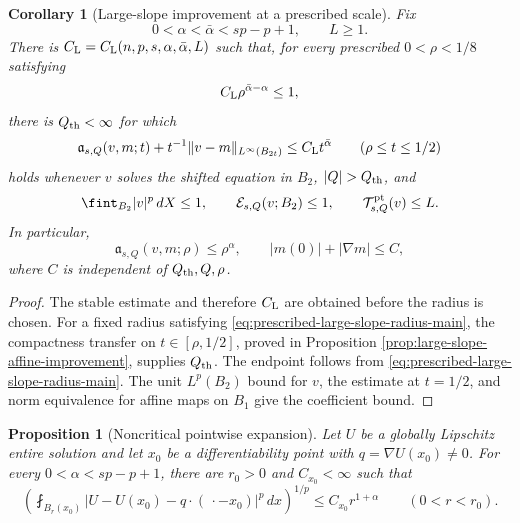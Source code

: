 \documentclass[11pt,reqno]{amsart}
\numberwithin{equation}{section}
\newcommand{\dd}{\,d}
\newtheorem{proposition}[theorem]{Proposition}
\newtheorem{corollary}[theorem]{Corollary}
\theoremstyle{remark}
\begin{document}
\begin{corollary}[Large-slope improvement at a prescribed scale]
\label{cor:prescribed-large-slope-block-main}
Fix
\[
 0<\alpha<\bar\alpha<sp-p+1,
 \qquad L\ge1.
\]
There is \(C_{\rm L}=C_{\rm L}(n,p,s,\alpha,\bar\alpha,L)\)
such that, for every prescribed \(0<\rho<1/8\) satisfying
\begin{equation}
 C_{\rm L}\rho^{\bar\alpha-\alpha}\le1,
 \label{eq:prescribed-large-slope-radius-main}
\end{equation}
there is \(Q_{\rm th}<\infty\) for which
\begin{equation}
 \mathfrak a_{s,Q}(v,m;t)
 +t^{-1}\|v-m\|_{L^\infty(B_{2t})}
 \le C_{\rm L}t^{\bar\alpha}
 \qquad(\rho\le t\le1/2)
 \label{eq:prescribed-large-slope-full-block-main}
\end{equation}
holds whenever \(v\) solves the shifted equation in \(B_2\),
\(|Q|>Q_{\rm th}\), and
\[
 \fint_{B_2}|v|^p\dd X\le1,\qquad
 \mathcal E_{s,Q}(v;B_2)\le1,\qquad
 \mathcal T^{\rm pt}_{s,Q}(v)\le L.
\]
In particular,
\[
 \mathfrak a_{s,Q}(v,m;\rho)\le\rho^\alpha,
 \qquad |m(0)|+|\nabla m|\le C,
\]
where \(C\) is independent of \(Q_{\rm th},Q,\rho\).
\end{corollary}

\begin{proof}
The stable estimate and therefore \(C_{\rm L}\) are obtained before
the radius is chosen.  For a fixed radius satisfying
\eqref{eq:prescribed-large-slope-radius-main}, the compactness transfer
on \(t\in[\rho,1/2]\), proved in Proposition
\ref{prop:large-slope-affine-improvement}, supplies \(Q_{\rm th}\).
The endpoint follows from
\eqref{eq:prescribed-large-slope-radius-main}.  The unit \(L^p(B_2)\)
bound for \(v\), the estimate at \(t=1/2\), and norm equivalence for
affine maps on \(B_1\) give the coefficient bound.
\end{proof}

\begin{proposition}[Noncritical pointwise expansion]
\label{prop:noncritical-pointwise-expansion}
Let \(U\) be a globally Lipschitz entire solution and let \(x_0\) be a
differentiability point with \(q=\nabla U(x_0)\ne0\).  For every
\(0<\alpha<sp-p+1\), there are \(r_0>0\) and \(C_{x_0}<\infty\) such that
\begin{equation}
 \left(\fint_{B_r(x_0)}
 |U-U(x_0)-q\cdot(\,\cdot-x_0)|^p\dd x\right)^{1/p}
 \le C_{x_0}r^{1+\alpha}
 \qquad(0<r<r_0).
 \label{eq:large-slope-noncritical-expansion}
\end{equation}
\end{proposition}
\end{document}
